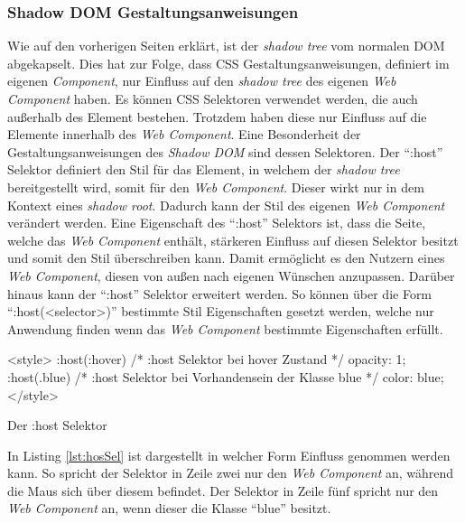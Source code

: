 \documentclass[12pt, paper=a4, bibtotoc, toc=listof, headsepline=true]{scrreprt}
\begin{document}
		\subsubsection{Shadow DOM Gestaltungsanweisungen}
		Wie auf den vorherigen Seiten erklärt, ist der \emph{shadow tree} vom normalen \ac{DOM} abgekapselt. Dies hat zur Folge, dass \ac{CSS} Gestaltungsanweisungen, definiert im eigenen \emph{Component}, nur Einfluss auf den \emph{shadow tree} des eigenen \emph{Web Component} haben. Es können \ac{CSS} Selektoren verwendet werden, die auch außerhalb des Element bestehen. Trotzdem haben diese nur Einfluss auf die Elemente innerhalb des \emph{Web Component}.  
		 \newline
		Eine Besonderheit der Gestaltungsanweisungen des \emph{Shadow DOM} sind dessen Selektoren. Der \enquote{:host} Selektor definiert den Stil für das Element, in welchem der \emph{shadow tree} bereitgestellt wird, somit für den \emph{Web Component}. Dieser wirkt nur in dem Kontext eines \emph{shadow root}. Dadurch kann der Stil des eigenen \emph{Web Component} verändert werden. Eine Eigenschaft des \enquote{:host} Selektors ist, dass die Seite, welche das \emph{Web Component} enthält, stärkeren Einfluss auf diesen Selektor besitzt und somit den Stil überschreiben kann. Damit ermöglicht es den Nutzern eines \emph{Web Component}, diesen von außen nach eigenen Wünschen anzupassen. Darüber hinaus kann der \enquote{:host} Selektor erweitert werden. So können über die Form \enquote{:host(<selector>)} bestimmte Stil Eigenschaften gesetzt werden, welche nur Anwendung finden wenn das \emph{Web Component} bestimmte Eigenschaften erfüllt. 
		\begin{listing}
		\begin{HTMLcode*}{}
<style>		
:host(:hover) { /* :host Selektor bei hover Zustand */
   opacity: 1;
}
:host(.blue) { /* :host Selektor bei Vorhandensein der Klasse blue */
   color: blue;
}
</style>
		\end{HTMLcode*}
		\caption{Der :host Selektor}
		\label{lst:hosSel}
		\end{listing}
		In Listing \ref{lst:hosSel} ist dargestellt in welcher Form Einfluss genommen werden kann. So spricht der Selektor in Zeile zwei nur den \emph{Web Component} an, während die Maus sich über diesem befindet. Der Selektor in Zeile fünf spricht nur den \emph{Web Component} an, wenn dieser die Klasse \enquote{blue} besitzt.
\end{document}

